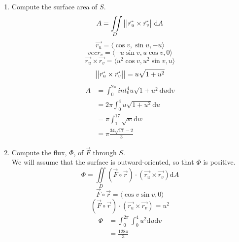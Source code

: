 \begin{enumerate}
\begin{enumerate}[label=\alph*.]
		\item Compute the surface area of $S$.\\
		\begin{equation*}
			A = \iint\limits_{D}{\big\lvert \big\lvert \vec{r_u} \times \vec{r_v} \big\rvert \big\rvert\mathrm{d}A}
		\end{equation*}
		\begin{equation*}
			\vec{r_u} = \langle \cos{v}, \sin{u}, -u \rangle
		\end{equation*}
		\begin{equation*}
			vec{r_v} = \langle -u\sin{v}, u\cos{v}, 0 \rangle
		\end{equation*}
		\begin{equation*}
			\vec{r_u} \times \vec{r_v} = \langle u^2\cos{v}, u^2\sin{v}, u\rangle
		\end{equation*}
		\begin{equation*}
			\big\lvert \big\lvert \vec{r_u} \times \vec{r_v} \big\rvert \big\rvert = u\sqrt{1 + u^2}
		\end{equation*}
		\begin{align*}
			A &= \int_{0}^{2\pi}{int_{0}^{4}{u\sqrt{1 + u^2}\mathrm{d}u}\mathrm{d}v} \\
			&= 2\pi\int_{0}^{4}{u\sqrt{1 + u^2}\mathrm{d}u} \\
			&= \pi\int_{1}^{17}{\sqrt{w}\mathrm{d}w} \\
			&= \pi\frac{34\sqrt{17} - 2}{3}
		\end{align*}
		
		\item Compute the flux, $\Phi$, of $\vec{F}$ through $S$.\\
		We will assume that the surface is outward-oriented, so that $\Phi$ is positive.
		\begin{equation*}
			\Phi = \iint\limits_{D}{\left(\vec{F}\circ\vec{r}\right) \cdot \left(\vec{r_u} \times \vec{r_v}\right)\mathrm{d}A}
		\end{equation*}
		\begin{equation*}
			\vec{F}\circ\vec{r} = \langle \cos{v}\sin{v}, 0 \rangle
		\end{equation*}
		\begin{equation*}
			\left(\vec{F}\circ\vec{r}\right) \cdot \left(\vec{r_u} \times \vec{r_v}\right) = u^2
		\end{equation*}
		\begin{align*}
			\Phi &= \int_{0}^{2\pi}{\int_{0}^{4}{u^2\mathrm{d}u}\mathrm{d}v} \\
			&= \frac{128\pi}{3}
		\end{align*}
	\end{enumerate}
	

\end{enumerate}
